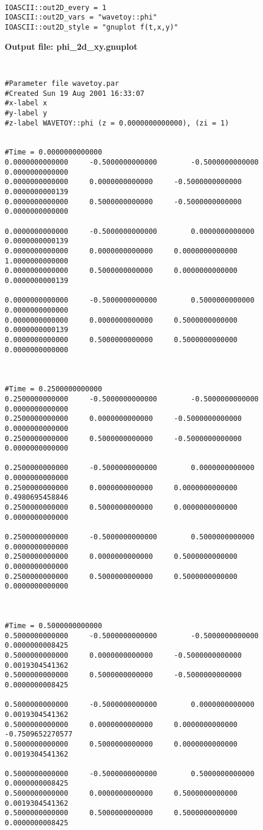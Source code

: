 \documentclass{article}
\begin{document}
{\tt
\begin{verbatim}
IOASCII::out2D_every = 1
IOASCII::out2D_vars = "wavetoy::phi"
IOASCII::out2D_style = "gnuplot f(t,x,y)"
\end{verbatim}
}

\noindent
{\bf Output file: phi\_2d\_xy.gnuplot}
{\tt
\begin{verbatim}
#Parameter file wavetoy.par
#Created Sun 19 Aug 2001 16:33:07
#x-label x
#y-label y
#z-label WAVETOY::phi (z = 0.0000000000000), (zi = 1)


#Time = 0.0000000000000
0.0000000000000		-0.5000000000000		-0.5000000000000		0.0000000000000
0.0000000000000		0.0000000000000		-0.5000000000000		0.0000000000139
0.0000000000000		0.5000000000000		-0.5000000000000		0.0000000000000

0.0000000000000		-0.5000000000000		0.0000000000000		0.0000000000139
0.0000000000000		0.0000000000000		0.0000000000000		1.0000000000000
0.0000000000000		0.5000000000000		0.0000000000000		0.0000000000139

0.0000000000000		-0.5000000000000		0.5000000000000		0.0000000000000
0.0000000000000		0.0000000000000		0.5000000000000		0.0000000000139
0.0000000000000		0.5000000000000		0.5000000000000		0.0000000000000



#Time = 0.2500000000000
0.2500000000000		-0.5000000000000		-0.5000000000000		0.0000000000000
0.2500000000000		0.0000000000000		-0.5000000000000		0.0000000000000
0.2500000000000		0.5000000000000		-0.5000000000000		0.0000000000000

0.2500000000000		-0.5000000000000		0.0000000000000		0.0000000000000
0.2500000000000		0.0000000000000		0.0000000000000		0.4980695458846
0.2500000000000		0.5000000000000		0.0000000000000		0.0000000000000

0.2500000000000		-0.5000000000000		0.5000000000000		0.0000000000000
0.2500000000000		0.0000000000000		0.5000000000000		0.0000000000000
0.2500000000000		0.5000000000000		0.5000000000000		0.0000000000000



#Time = 0.5000000000000
0.5000000000000		-0.5000000000000		-0.5000000000000		0.0000000008425
0.5000000000000		0.0000000000000		-0.5000000000000		0.0019304541362
0.5000000000000		0.5000000000000		-0.5000000000000		0.0000000008425

0.5000000000000		-0.5000000000000		0.0000000000000		0.0019304541362
0.5000000000000		0.0000000000000		0.0000000000000		-0.7509652270577
0.5000000000000		0.5000000000000		0.0000000000000		0.0019304541362

0.5000000000000		-0.5000000000000		0.5000000000000		0.0000000008425
0.5000000000000		0.0000000000000		0.5000000000000		0.0019304541362
0.5000000000000		0.5000000000000		0.5000000000000		0.0000000008425
\end{verbatim}
}

%



\end{document}
